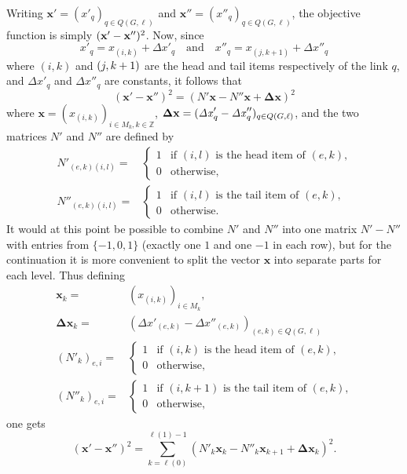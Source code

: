 \documentclass{article}
\newcommand{\Z}{\mathbb{Z}}
\newcommand{\vek}{\mathbf}
\theoremstyle{definition}
\begin{document}
Writing \(\vek{x}' = (x'_q)_{q \in Q(G,\ell)}\) and \(\vek{x}'' = 
(x''_q)_{q \in Q(G,\ell)}\), the objective function is simply 
$(\vek{x}' -\nobreak \vek{x}'')^2$. Now, since
\begin{equation}
  x'_q = x_{(i,k)} + \mathit{\Delta x}'_q
  \quad\text{and}\quad
  x''_q = x_{(j,k+1)} + \mathit{\Delta x}''_q
\end{equation}
where $(i,k)$ and $(j,k +\nobreak 1)$ are the head and tail items 
respectively of the link $q$, and $\mathit{\Delta x}'_q$ and 
$\mathit{\Delta x}''_q$ are constants, it follows that
\begin{equation}
  (\vek{x}' - \vek{x}'')^2 =
  (N' \vek{x} - N''\vek{x} + \vek{\Delta x})^2
\end{equation}
where \(\vek{x} = (x_{(i,k)})_{i \in M_k, k \in \Z}\), 
\(\vek{\Delta x} = (\mathit{\Delta x}'_q -\nobreak 
\mathit{\Delta x}''_q)_{q \in Q(G,\ell)}\), and the two matrices $N'$ 
and $N''$ are defined by
\begin{align*}
  N'_{(e,k)(i,l)} ={}& \begin{cases}
    1& \text{if $(i,l)$ is the head item of $(e,k)$,}\\
    0& \text{otherwise,}
  \end{cases}\\
  N''_{(e,k)(i,l)} ={}& \begin{cases}
    1& \text{if $(i,l)$ is the tail item of $(e,k)$,}\\
    0& \text{otherwise.}
  \end{cases}
\end{align*}
It would at this point be possible to combine $N'$ and $N''$ into one 
matrix $N'-N''$ with entries from $\{-1,0,1\}$ (exactly one $1$ and 
one $-1$ in each row), but for the continuation it is more convenient 
to split the vector $\vek{x}$ into separate parts for each level. 
Thus defining
\begin{align*}
  \vek{x}_k ={}& (x_{(i,k)})_{i \in M_k} \text{,}\\
  \vek{\Delta x}_k ={}& (\mathit{\Delta x}'_{(e,k)} - 
    \mathit{\Delta x}''_{(e,k)} )_{(e,k) \in Q(G,\ell)} \\
  (N'_k)_{e,i} ={}& \begin{cases}
    1& \text{if $(i,k)$ is the head item of $(e,k)$,}\\
    0& \text{otherwise,}
  \end{cases}\\
  (N''_k)_{e,i} ={}& \begin{cases}
    1& \text{if $(i,k+1)$ is the tail item of $(e,k)$,}\\
    0& \text{otherwise,}
  \end{cases}
\end{align*}
one gets
\begin{equation}
  (\vek{x}' - \vek{x}'')^2 = \sum_{k=\ell(0)}^{\ell(1)-1} 
  (N'_k \vek{x}_k - N''_k \vek{x}_{k+1} + \vek{\Delta x}_k)^2
  \text{.}
\end{equation}
\end{document}
